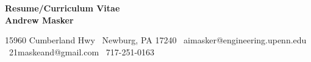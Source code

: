 \begin{center}
    \textbf{Resume/Curriculum Vitae}\\ 
    \textbf{Andrew Masker}\\
    \hrulefill
\end{center}

\begin{center}
    15960 Cumberland Hwy \textbullet \ Newburg, PA 17240 \textbullet \ aimasker@engineering.upenn.edu \textbullet \ 21maskeand@gmail.com \textbullet \ 717-251-0163
\end{center}
